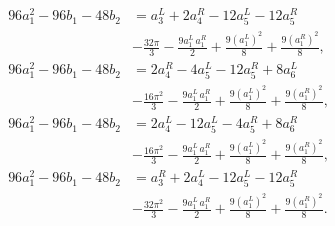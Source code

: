 \begin{equation}\begin{split}
96a_1^2-96b_1-48b_2& = a_3^L+2a_4^R-12a_5^L-12a_5^R\\&-\frac{32\pi}3-\frac{9a_1^L\, a_1^R}{2}+\frac{9(a_1^L)^2}{8}+\frac{9(a_1^R)^2}{8},\\
96a_1^2-96b_1-48b_2& = 2a_4^R-4a_5^L-12a_5^R+8a_6^L\\&-\frac{16\pi^2}3-\frac{9a_1^L\, a_1^R}{2}+\frac{9(a_1^L)^2}{8}+\frac{9(a_1^R)^2}{8},\\
96a_1^2-96b_1-48b_2& = 2a_4^L-12a_5^L-4a_5^R+8a_6^R\\&-\frac{16\pi^2}3-\frac{9a_1^L\, a_1^R}{2}+\frac{9(a_1^L)^2}{8}+\frac{9(a_1^R)^2}{8},\\
96a_1^2-96b_1-48b_2& =
a_3^R+2a_4^L-12a_5^L-12a_5^R\\&-\frac{32\pi^2}3-\frac{9a_1^L\,
a_1^R}{2}+\frac{9(a_1^L)^2}{8}+\frac{9(a_1^R)^2}{8}.
\end{split}\end{equation}

